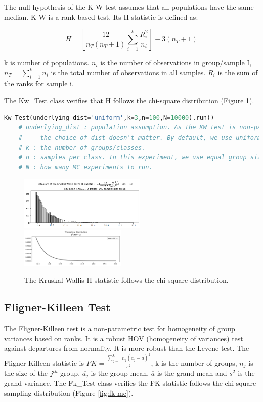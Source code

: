 \documentclass[11pt, letterpaper]{article}
\begin{document}
The null hypothesis of the K-W test assumes that all populations have the same median.
K-W is a rank-based test. Its H statistic is defined as:

\begin{equation}
    \label{deqn_ex10}
    H=[\frac{12}{n_{T}(n_{T}+1)}\sum_{i=1}^{k}\frac{R_{i}^{2}}{n_{i}}]-3(n_{T}+1)
\end{equation}

\noindent k is number of populations. $n_{i}$ is the number of observations in group/sample I,
$n_{T}=\sum_{i=1}^{k}n_{i}$ is the total number of observations in all samples.
$R_{i}$ is the sum of the ranks for sample i.

The Kw\_Test class verifies that H follows the chi-square distribution (Figure \ref{fig:kw mc}).

\lstset{
    basicstyle=\footnotesize,
    xleftmargin=-1em,aboveskip=0.5em,belowskip=0.5em
}
\begin{lstlisting}[language=python]
    Kw_Test(underlying_dist='uniform',k=3,n=100,N=10000).run()
    # underlying_dist : population assumption. As the KW test is non-parametric, 
    #     the choice of dist doesn't matter. By default, we use uniform.
    # k : the number of groups/classes.
    # n : samples per class. In this experiment, we use equal group size, i.e., n1=n2=n3=...
    # N : how many MC experiments to run.
    \end{lstlisting}

\begin{figure}[htbp]
    \centering
    \includegraphics[width=0.54\textwidth]{fig11-kw mc1.png}
    \includegraphics[width=0.45\textwidth]{fig11-kw mc2.png}
    \caption{The Kruskal Wallis H statistic follows the chi-square distribution.}
    \label{fig:kw mc}
\end{figure}

\subsection{Fligner-Killeen Test}
The Fligner-Killeen test is a non-parametric test for homogeneity of group variances
based on ranks. It is a robust HOV (homogeneity of variances) test against departures from normality.
It is more robust than the Levene test. The Fligner Killeen statistic is $FK=\frac{\sum_{j=1}^{k}n_{j}(\overline{a_{j}}-\overline{a})^2}{s^2}$,
k is the number of groups, $n_{j}$ is the size of the $j^{th}$ group, $\overline{a_{j}}$ is the group mean, $\overline{a}$ is the grand mean and
$s^2$ is the grand variance. The Fk\_Test class verifies the FK statistic follows the chi-square sampling distribution (Figure \ref{fig:fk mc}).
\end{document}
